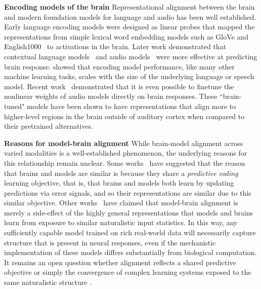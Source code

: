 \documentclass{article}
\theoremstyle{plain}
\theoremstyle{definition}
\theoremstyle{remark}
\newcommand{\mypar}[1]{\textbf{#1}\quad}
\begin{document}
\mypar{Encoding models of the brain} 
Representational alignment between the brain and modern foundation models for language and audio has been well established. Early language encoding models were designed as linear probes that mapped the representations from simple lexical word embedding models such as GloVe and English1000~\cite{huth2016natural} to activations in the brain. Later work demonstrated that contextual language models~\cite{JAINNEURIPS2018} and audio models~\cite{vaidya2022self, millet2022toward} were more effective at predicting brain response. \citeauthor{antonello2023scaling} showed that encoding model performance, like many other machine learning tasks, scales with the size of the underlying language or speech model. Recent work~\cite{vattikonda2025brainwavlmfinetuningspeechrepresentations, moussa2025brain} demonstrated that it is even possible to finetune the nonlinear weights of audio models directly on brain responses. These ``brain-tuned" models have been shown to have representations that align more
to higher-level regions in the brain outside of auditory cortex when compared to their pretrained alternatives.

\mypar{Reasons for model-brain alignment} While brain-model alignment across varied modalities is a well-established phenomenon, the underlying reasons for this relationship remain unclear. Some works~\cite{schrimpf2018brain, caucheteux2023evidence, Goldstein2020.12.02.403477} have suggested that the reason that brains and models are similar is because they share a \emph{predictive coding} learning objective, that is, that brains and models both learn by updating predictions via error signals, and so their representations are similar due to this similar objective. Other works~\cite{antonello2022predictive, schonmann2025stimulus} have claimed that model-brain alignment is merely a side-effect of the highly general representations that models and brains learn from exposure to similar naturalistic input statistics. In this way, any sufficiently capable model trained on rich real-world data will necessarily capture structure that is present in neural responses, even if the mechanistic implementation of these models differs substantially from biological computation. It remains an open question whether alignment reflects a shared predictive objective or simply the convergence of complex learning systems exposed to the same naturalistic structure \citep{huhplatonic}.
\end{document}
